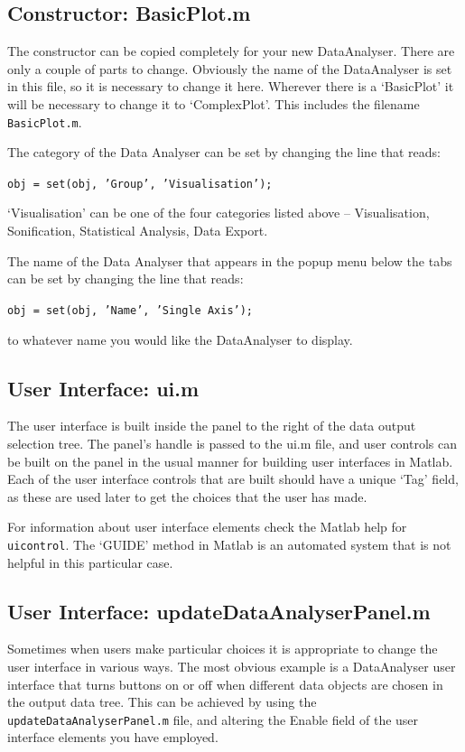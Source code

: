 \documentclass{article}
\begin{document}
\subsection{Constructor: BasicPlot.m}

The constructor can be copied completely for your new DataAnalyser. There are only a couple of parts to change. Obviously the name of the DataAnalyser is set in this file, so it is necessary to change it here. Wherever there is a `BasicPlot' it will be necessary to change it to `ComplexPlot'. This includes the filename \texttt{BasicPlot.m}. 

The category of the Data Analyser can be set by changing the line that reads: 

\texttt{obj = set(obj, 'Group', 'Visualisation');}

`Visualisation' can be one of the four categories listed above -- Visualisation, Sonification, Statistical Analysis, Data Export.  


The name of the Data Analyser that appears in the popup menu below the tabs can be set by changing the line that reads: 

\texttt{obj = set(obj, 'Name',  'Single Axis');}

to whatever name you would like the DataAnalyser to display.

\subsection{User Interface: ui.m}

The user interface is built inside the panel to the right of the data output selection tree. The panel's handle is passed to the ui.m file, and user controls can be built on the panel in the usual manner for building user interfaces in Matlab. Each of the user interface controls that are built should have a unique `Tag' field, as these are used later to get the choices that the user has made. 

For information about user interface elements check the Matlab help for \texttt{uicontrol}. The `GUIDE' method in Matlab is an automated system that is not helpful in this particular case.

\subsection{User Interface: updateDataAnalyserPanel.m}

Sometimes when users make particular choices it is appropriate to change the user interface in various ways. The most obvious example is a DataAnalyser user interface that turns buttons on or off when different data objects are chosen in the output data tree. This can be achieved by using the \texttt{updateDataAnalyserPanel.m} file, and altering the Enable field of the user interface elements you have employed. 
\end{document}

